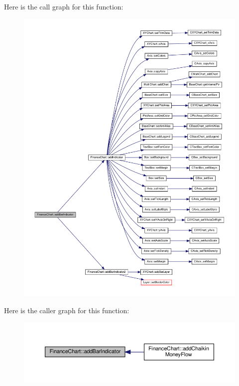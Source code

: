 Here is the call graph for this function\+:
\nopagebreak
\begin{figure}[H]
\begin{center}
\leavevmode
\includegraphics[width=350pt]{class_finance_chart_accbcf43fbdc88401416addefeaf06124_cgraph}
\end{center}
\end{figure}
Here is the caller graph for this function\+:
\nopagebreak
\begin{figure}[H]
\begin{center}
\leavevmode
\includegraphics[width=350pt]{class_finance_chart_accbcf43fbdc88401416addefeaf06124_icgraph}
\end{center}
\end{figure}
\mbox{\label{class_finance_chart_a0578e0d86422fa48ffc07a54c2216d94}} 

